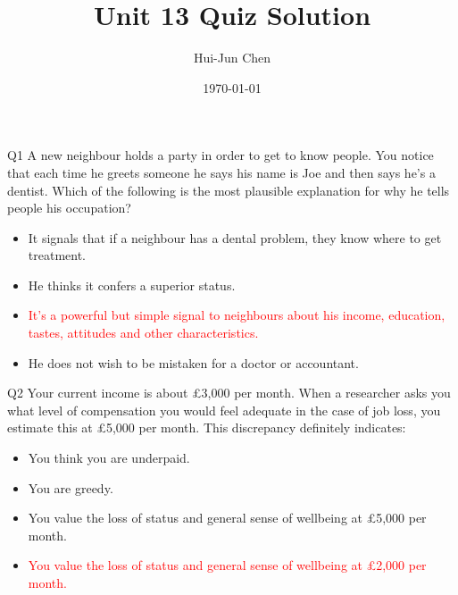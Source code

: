 \documentclass{beamer}
\title{Unit 13 Quiz Solution}
\author{Hui-Jun Chen}
\institute{The Ohio State University}
\date{\today}
\newcommand{\red}[1]{\textcolor{red}{#1}}
\begin{document}
\maketitle



\begin{frame}{Q1}
    A new neighbour holds a party in order to get to know people. You notice that each time he greets someone he says his name is Joe and then says he’s a dentist. Which of the following is the most plausible explanation for why he tells people his occupation?
    \begin{itemize}
        \item It signals that if a neighbour has a dental problem, they know where to get treatment.
        \item He thinks it confers a superior status.
        \item \red{It’s a powerful but simple signal to neighbours about his income, education, tastes, attitudes and other characteristics.}

        \item He does not wish to be mistaken for a doctor or accountant.
    \end{itemize}

\end{frame}


\begin{frame}{Q2}
\label{slide:Q2}
    Your current income is about £3,000 per month. When a researcher asks you what level of compensation you would feel adequate in the case of job loss, you estimate this at £5,000 per month. This discrepancy definitely indicates:
    \begin{itemize}
        \item You think you are underpaid.
        \item You are greedy.
        \item You value the loss of status and general sense of wellbeing at £5,000 per month.
        \item \red{You value the loss of status and general sense of wellbeing at £2,000 per month.}
    \end{itemize}

\end{frame}
\end{document}
